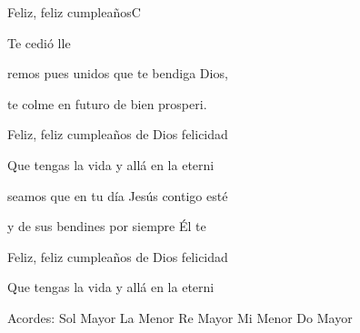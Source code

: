 \documentclass[12pt, spanish]{book}
\begin{document}
\begin{song}{Feliz, feliz cumpleaños}{C}
\begin{SBOpGroup}
            Te cedió lle
        \end{SBOpGroup}

        \begin{SBOpGroup}
            remos pues unidos que te bendiga Dios,

            te colme en  futuro de bien prosperi.

            Feliz, feliz cumpleaños de Dios felicidad

            Que tengas  la vida y allá en la eterni
        \end{SBOpGroup}

        \begin{SBOpGroup}
            seamos que en tu día Jesús contigo esté

            y de sus bendines por siempre Él te 

            Feliz, feliz cumpleaños de Dios felicidad

            Que tengas  la vida y allá en la eterni
        \end{SBOpGroup}

        \ifChordBk
        \begin{SBOpGroup}
            Acordes:
            \upchord{\G}\qquad Sol Mayor \hfill
            \upchord{\Am}\qquad La Menor \hfill\null\break
            \upchord{\D}\qquad Re Mayor \hfill
            \upchord{\Em}\qquad Mi Menor \hfill
            \upchord{\C}\qquad Do Mayor \hfill\null\break
        \end{SBOpGroup}
        \fi
    \end{song}
\end{document}
